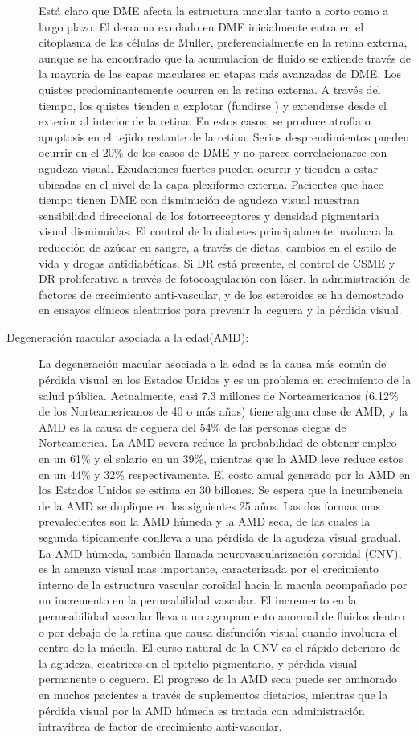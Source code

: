 \begin{description}
Está claro que DME afecta la estructura macular tanto a corto como a largo plazo. El derrama exudado en DME inicialmente entra en el citoplasma de las células de Muller, preferencialmente en la retina externa, aunque se ha encontrado que la acumulacion de fluido se extiende través de la mayoría de las capas maculares en etapas más avanzadas de DME. Los quistes predominantemente ocurren en la retina externa. A través del tiempo, los quistes tienden a explotar (fundirse ) y extenderse desde el exterior al interior de la retina. En estos casos, se produce atrofia o apoptosis en el tejido restante de la retina. Serios desprendimientos pueden ocurrir en el 20\% de los casos de DME y no parece correlacionarse con agudeza visual. Exudaciones fuertes pueden ocurrir y tienden a estar ubicadas en el nivel de la capa plexiforme externa. Pacientes que hace tiempo tienen DME con disminución de agudeza visual muestran sensibilidad direccional de los fotorreceptores y densidad pigmentaria visual disminuidas.
El control de la diabetes principalmente involucra la reducción de azúcar en sangre, a través de dietas, cambios en el estilo de vida y drogas antidiabéticas. Si DR está presente,  el control de CSME y DR proliferativa a través de fotocoagulación con láser, la administración de factores de crecimiento anti-vascular, y de los esteroides se ha demostrado en ensayos clínicos aleatorios para prevenir la ceguera y la pérdida visual.
    \item[Degeneración macular asociada a la edad(AMD):]La degeneración macular asociada a la edad es la causa más común de pérdida visual en los Estados Unidos y es un problema en crecimiento de la salud pública. Actualmente, casi 7.3 millones de Norteamericanos (6.12\% de los Norteamericanos de 40 o más años) tiene alguna clase de AMD, y la AMD es la causa de ceguera del 54\% de las personas ciegas de Norteamerica. La AMD severa reduce la probabilidad de obtener empleo en un 61\% y el salario en un 39\%, mientras que la AMD leve reduce estos en un 44\% y 32\% respectivamente. El costo anual generado por la AMD en los Estados Unidos se estima en 30 billones. Se espera que la incumbencia de la AMD se duplique en los siguientes 25 años. Las dos formas mas prevalecientes son la AMD húmeda y la AMD seca, de las cuales la segunda típicamente conlleva a una pérdida de la agudeza visual gradual. La AMD húmeda, también llamada neurovascularización coroidal (CNV), es la amenza visual mas importante, caracterizada por el crecimiento interno de la estructura vascular coroidal hacia la macula acompañado por un incremento en la permeabilidad vascular. El incremento en la permeabilidad vascular lleva a un agrupamiento anormal de fluidos dentro o por debajo de la retina que causa disfunción visual cuando involucra el centro de la mácula. El curso natural de la CNV es el rápido deterioro de la agudeza, cicatrices en el epitelio pigmentario, y pérdida visual permanente o ceguera. El progreso de la AMD seca puede ser aminorado en muchos pacientes a través de suplementos dietarios, mientras que la pérdida visual por la AMD húmeda es tratada con administración intravítrea de factor de crecimiento anti-vascular.
     

\end{description}
